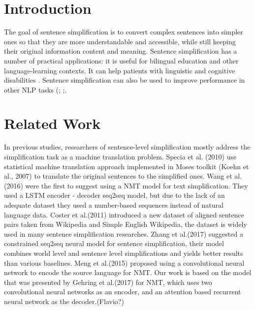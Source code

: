 \documentclass{article}
\begin{document}
\section{Introduction}
\label{Intro}

The goal of sentence simplification is to convert complex sentences into simpler ones so that they are more understandable and accessible, while still keeping their original information content and meaning. Sentence simplification has a number of practical applications: it is useful for bilingual education and other language-learning contexts. It can help patients with linguistic and cognitive disabilities \cite{Carroll99simplifyingtext}. Sentence simplification can also be used to improve performance in other NLP tasks (\cite{niklaus2017sentence}; \cite{Chandrasekar:1996:MMT:993268.993361};\cite{10.1007/978-3-540-30468-5_47}.


\section{Related Work}

In previous studies, researchers of sentence-level simplification mostly address the simplification task as a machine translation problem. Specia et al. (2010) use  statistical machine translation approach implemented in Moses toolkit (Koehn et al., 2007) to translate the original sentences to the simplified ones. Wang et al. (2016) were the first to suggest using a NMT model for text simplification. They used a LSTM encoder - decoder seq2seq model, but due to the lack of an adequate dataset they used a number-based sequences instead of natural language data. Coster et al.(2011) introduced a new dataset of aligned sentence pairs taken from Wikipedia and Simple English Wikipedia, the dataset is widely used in many sentence simplification researches. Zhang et al.(2017) suggested a constrained seq2seq neural model for sentence simplification, their model combines world level and sentence level simplifications and yields better results than various baselines. Meng et al.(2015) proposed using a convolutional neural network to encode the source language for NMT. Our work is based on the model that was presented by Gehring et al.(2017) for NMT, which uses two convolutional neural networks as an encoder, and an attention based recurrent neural network as the decoder.(Flavio?)
\end{document}
